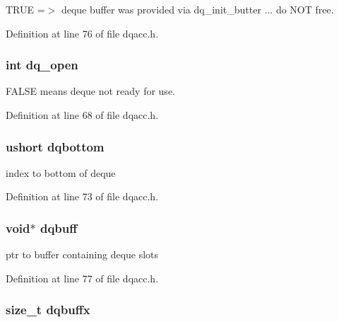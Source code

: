 T\-R\-U\-E =$>$ deque buffer was provided via dq\-\_\-init\-\_\-butter ... do N\-O\-T free. 



Definition at line 76 of file dqacc.\-h.

\hypertarget{struct_d_q_h_e_a_d_e_r_a2cfb815275868f448170339b01fb68a6}{
\subsubsection[{dq\-\_\-open}]{\setlength{\rightskip}{0pt plus 5cm}int dq\-\_\-open}}\label{struct_d_q_h_e_a_d_e_r_a2cfb815275868f448170339b01fb68a6}


F\-A\-L\-S\-E means deque not ready for use. 



Definition at line 68 of file dqacc.\-h.

\hypertarget{struct_d_q_h_e_a_d_e_r_afca630b0864cea4021c566c2d2f07aa1}{
\subsubsection[{dqbottom}]{\setlength{\rightskip}{0pt plus 5cm}ushort dqbottom}}\label{struct_d_q_h_e_a_d_e_r_afca630b0864cea4021c566c2d2f07aa1}


index to bottom of deque 



Definition at line 73 of file dqacc.\-h.

\hypertarget{struct_d_q_h_e_a_d_e_r_aa14fd3b6ea131b35ec542792afb17003}{
\subsubsection[{dqbuff}]{\setlength{\rightskip}{0pt plus 5cm}void$\ast$ dqbuff}}\label{struct_d_q_h_e_a_d_e_r_aa14fd3b6ea131b35ec542792afb17003}


ptr to buffer containing deque slots 



Definition at line 77 of file dqacc.\-h.

\hypertarget{struct_d_q_h_e_a_d_e_r_abd11a78ad177d4e8fb1ef0af8d025782}{
\subsubsection[{dqbuffx}]{\setlength{\rightskip}{0pt plus 5cm}size\-\_\-t dqbuffx}}\label{struct_d_q_h_e_a_d_e_r_abd11a78ad177d4e8fb1ef0af8d025782}


